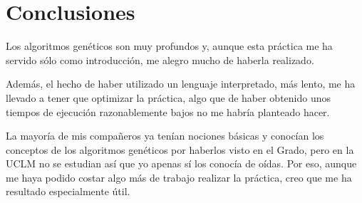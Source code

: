 \chapter{Conclusiones}
\label{chap:concl}

Los algoritmos genéticos son muy profundos y, aunque esta práctica me ha servido sólo como introducción, me alegro mucho de haberla realizado. 

Además, el hecho de haber utilizado un lenguaje interpretado, más lento, me ha llevado a tener que optimizar la práctica, algo que de haber obtenido unos tiempos de ejecución razonablemente bajos no me habría planteado hacer.

La mayoría de mis compañeros ya tenían nociones básicas y conocían los conceptos de los algoritmos genéticos por haberlos visto en el Grado, pero en la UCLM no se estudian así que yo apenas sí los conocía de oídas. Por eso, aunque me haya podido costar algo más de trabajo realizar la práctica, creo que me ha resultado especialmente útil.

